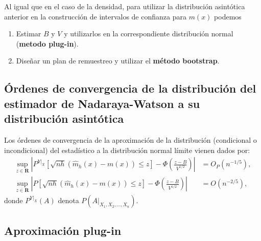 \documentclass[
]{book}
\theoremstyle{definition}
\theoremstyle{definition}
\theoremstyle{definition}
\theoremstyle{remark}
\begin{document}
Al igual que en el caso de la densidad, para utilizar la distribución
asintótica anterior en la construcción de intervalos de confianza para
\(m\left( x \right)\) podemos

\begin{enumerate}
\def\labelenumi{\arabic{enumi}.}
\item
  Estimar \(B\) y \(V\) y utilizarlos en la correspondiente distribución
  normal (\textbf{metodo plug-in}).
\item
  Diseñar un plan de remuestreo y utilizar el \textbf{método bootstrap}.
\end{enumerate}

\hypertarget{uxf3rdenes-de-convergencia-de-la-distribuciuxf3n-del-estimador-de-nadaraya-watson-a-su-distribuciuxf3n-asintuxf3tica}{%
\subsection{Órdenes de convergencia de la distribución del estimador de Nadaraya-Watson a su distribución asintótica}\label{uxf3rdenes-de-convergencia-de-la-distribuciuxf3n-del-estimador-de-nadaraya-watson-a-su-distribuciuxf3n-asintuxf3tica}}

Los órdenes de convergencia de la aproximación de la distribución
(condicional o incondicional) del estadístico a la distribución normal
límite vienen dados por:
\[\begin{aligned}
\sup_{z\in \boldsymbol{R}}\left\vert P^{\left. Y\right\vert _{X}}\left[ 
\sqrt{nh}\left( \hat{m}_{h}\left( x \right) -m\left( x \right) \right) \leq z
\right] -\Phi \left( \frac{z-B}{V^{1/2}} \right) \right\vert &= O_{P}\left(
n^{-1/5} \right), \\
\sup_{z\in \boldsymbol{R}}\left\vert P\left[ \sqrt{nh}\left( \hat{m}
_{h}\left( x \right) -m\left( x \right) \right) \leq z\right] -\Phi \left( 
\frac{z-B}{V^{1/2}} \right) \right\vert &= O\left( n^{-2/5} \right),
\end{aligned}\]
donde \(P^{\left. Y\right\vert_{X}}\left( A \right)\) denota
\(P\left( \left. A \right\vert_{X_1,X_2,\ldots ,X_n} \right)\).

\hypertarget{aproximaciuxf3n-plug-in-1}{%
\subsection{Aproximación plug-in}\label{aproximaciuxf3n-plug-in-1}}
\end{document}

